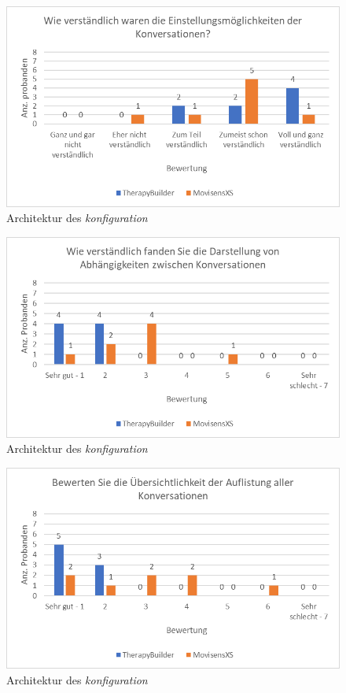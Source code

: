 \begin{figure}[h]
\centering
\includegraphics[width=1\textwidth]{pictures/diagramme/konversationeinstellung}
\caption{Architektur des \emph{konfiguration}}
\label{konversationeinstellung}
\end{figure}

\begin{figure}[h]
\centering
\includegraphics[width=1\textwidth]{pictures/diagramme/konversationenabhaeng}
\caption{Architektur des \emph{konfiguration}}
\label{konversationenabhaeng}
\end{figure}

\begin{figure}[h]
\centering
\includegraphics[width=1\textwidth]{pictures/diagramme/konversationenuebersicht}
\caption{Architektur des \emph{konfiguration}}
\label{konversationenuebersicht}
\end{figure}

